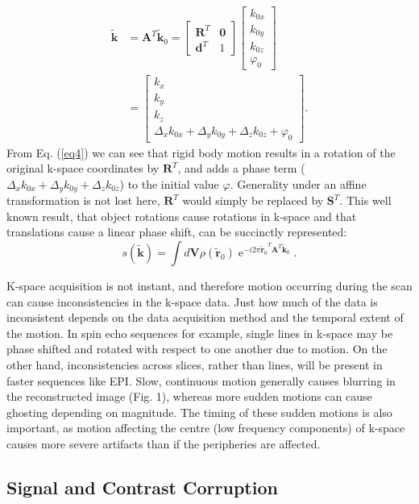 \documentclass[class=article, crop=false]{standalone}
\begin{document}
\begin{equation} \label{eq4}
	\begin{split}
		\tilde{\textbf{k}} & = \textbf{A}^T\tilde{\textbf{k}}_0
		= \begin{bmatrix}\textbf{R}^T & \textbf{0} \\ \textbf{d}^T & 1\end{bmatrix}\begin{bmatrix}k_{0x}\\k_{0y}\\k_{0z}\\\varphi_0\end{bmatrix}\\
		& = \begin{bmatrix}k_{x}\\k_{y}\\k_{z}\\\Delta_{x}k_{0x} + \Delta_{y}k_{0y} + \Delta_{z}k_{0z} + \varphi_0\end{bmatrix}.
	\end{split}
\end{equation}
From Eq. (\ref{eq4}) we can see that rigid body motion results in a rotation of the original k-space coordinates by $\textbf{R}^T$, and adds a phase term ($\Delta_{x}k_{0x} + \Delta_{y}k_{0y} + \Delta_{z}k_{0z}$) to the initial value $\varphi$. Generality under an affine transformation is not lost here, $\textbf{R}^T$ would simply be replaced by $\textbf{S}^T$. This well known result, that object rotations cause rotations in k-space and that translations cause a linear phase shift, can be succinctly represented:
\begin{equation} \label{eq5}
s(\tilde{\textbf{k}}) = \int d\textbf{V} \rho\left(\tilde{\textbf{r}}_0\right)\operatorname{e}^{-i2\pi{\tilde{\textbf{r}}_0}^{T}\textbf{A}^T\tilde{\textbf{k}}_0}.
\end{equation}
\par
K-space acquisition is not instant, and therefore motion occurring during the scan can cause inconsistencies in the k-space data. Just how much of the data is inconsistent depends on the data acquisition method and the temporal extent of the motion. In spin echo sequences for example, single lines in k-space may be phase shifted and rotated with respect to one another due to motion. On the other hand, inconsistencies across slices, rather than lines, will be present in faster sequences like EPI. Slow, continuous motion generally causes blurring in the reconstructed image (Fig. 1), whereas more sudden motions can cause ghosting depending on magnitude. The timing of these sudden motions is also important, as motion affecting the centre (low frequency components) of k-space causes more severe artifacts than if the peripheries are affected.

\subsection{Signal and Contrast Corruption}
\end{document}

